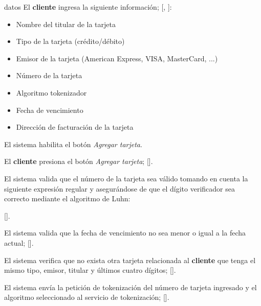{\begin{trayectoriaPrincipal}
    \item[datos] El \textbf{cliente} ingresa la siguiente información;
      [,
      ]:
      \begin{itemize}
        \item Nombre del titular de la tarjeta
        \item Tipo de la tarjeta (crédito/débito)
        \item Emisor de la tarjeta (American Express, VISA, MasterCard, ...)
        \item Número de la tarjeta
        \item Algoritmo tokenizador
        \item Fecha de vencimiento
        \item Dirección de facturación de la tarjeta
      \end{itemize}

    \item El sistema habilita el botón \textit{Agregar tarjeta}.

    \item El \textbf{cliente} presiona el botón \textit{Agregar tarjeta};
      [].

    \item El sistema valida que el número de la tarjeta sea válido tomando en
      cuenta la siguiente expresión regular y asegurándose de que el dígito
      verificador sea correcto mediante el algoritmo de Luhn:


      [].

    \item El sistema valida que la fecha de vencimiento no sea menor o igual a
      la fecha actual; [].

    \item El sistema verifica que no exista otra tarjeta relacionada al
      \textbf{cliente} que tenga el mismo tipo, emisor, titular y últimos
      cuatro dígitos; [].

    \item El sistema envía la petición de tokenización del número de tarjeta
      ingresado y el algoritmo seleccionado al servicio de tokenización;
      [].


\end{trayectoriaPrincipal}}
